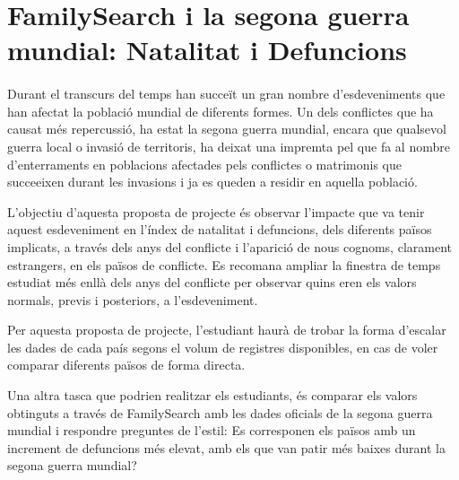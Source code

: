 \section{FamilySearch i la segona guerra mundial: Natalitat i Defuncions}

    \paragraph{}
    Durant el transcurs del temps han succeït un gran nombre d'esdeveniments que han afectat la població mundial de diferents formes. Un dels conflictes que ha causat més repercussió, ha estat la segona guerra mundial, encara que qualsevol guerra local o invasió de territoris, ha deixat una impremta pel que fa al nombre d'enterraments en poblacions afectades pels conflictes o matrimonis que succeeixen durant les invasions i ja es queden a residir en aquella població.

    L'objectiu d'aquesta proposta de projecte és observar l'impacte que va tenir aquest esdeveniment en l'índex de natalitat i defuncions, dels diferents països implicats, a través dels anys del conflicte i l'aparició de nous cognoms, clarament estrangers, en els països de conflicte. Es recomana ampliar la finestra de temps estudiat més enllà dels anys del conflicte per observar quins eren els valors normals, previs i posteriors, a l'esdeveniment.

    Per aquesta proposta de projecte, l'estudiant haurà de trobar la forma d'escalar les dades de cada país segons el volum de registres disponibles, en cas de voler comparar diferents països de forma directa.

    Una altra tasca que podrien realitzar els estudiants, és comparar els valors obtinguts a través de FamilySearch amb les dades oficials de la segona guerra mundial i respondre preguntes de l'estil: Es corresponen els països amb un increment de defuncions més elevat, amb els que van patir més baixes durant la segona guerra mundial?
